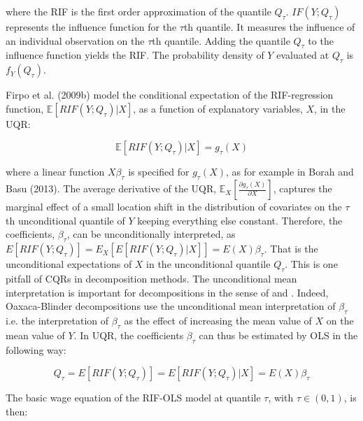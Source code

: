 where the RIF is the first order approximation of the quantile $Q_{\tau}$. $IF(Y; Q_{\tau})$ represents the influence function for the $\tau$th quantile. It measures the influence of an individual observation on the $\tau$th quantile. Adding the quantile $Q_{\tau}$ to the influence function yields the RIF. The probability density of $Y$ evaluated at $Q_{\tau}$ is $f_{Y}(Q_{\tau})$.

Firpo et al. (2009b) model the conditional expectation of the RIF-regression function, $\mathbb{E}[RIF(Y; Q_{\tau})|X]$, as a function of explanatory variables, $X$, in the UQR:

\begin{linenomath*}
	\begin{equation}
		\mathbb{E}[RIF(Y; Q_{\tau})|X] = g_{\tau}(X)
	\end{equation}
\end{linenomath*}

where a linear function $X \beta_{\tau}$ is specified for $g_{\tau}(X)$, as for example in Borah and Basu (2013). The average derivative of the UQR, $\mathbb{E}_{X}\left[ \frac{\partial g_{\tau}(X)}{\partial X} \right]$, captures the marginal effect of a small location shift in the distribution of covariates on the $\tau$th unconditional quantile of $Y$ keeping everything else constant. Therefore, the coefficients, $\beta_{\tau}$, can be unconditionally interpreted, as $E[RIF(Y; Q_{\tau})] = E_{X}[ E[RIF(Y; Q_{\tau})|X]] = E(X) \beta_{\tau}$. That is the unconditional expectations of $X$ in the unconditional quantile $Q_{\tau}$. This is one pitfall of CQRs in decomposition methods. The unconditional mean interpretation is important for decompositions in the sense of \textcite{Oaxaca1973} and \textcite{Blinder1973}. Indeed, Oaxaca-Blinder decompositions use the unconditional mean interpretation of $\beta_{\tau}$ i.e. the interpretation of $\beta_{\tau}$ as the effect of increasing the mean value of $X$ on the mean value of $Y$. In UQR, the coefficients $\beta_{\tau}$ can thus be estimated by OLS in the following way:

\begin{linenomath*}
	\begin{equation}
		Q_{\tau} = E[RIF(Y; Q_{\tau})] = E[RIF(Y; Q_{\tau})|X] =  E(X) \beta_{\tau}
	\end{equation}
\end{linenomath*}

The basic wage equation of the RIF-OLS model at quantile $\tau$, with $\tau \in (0,1)$, is then:

